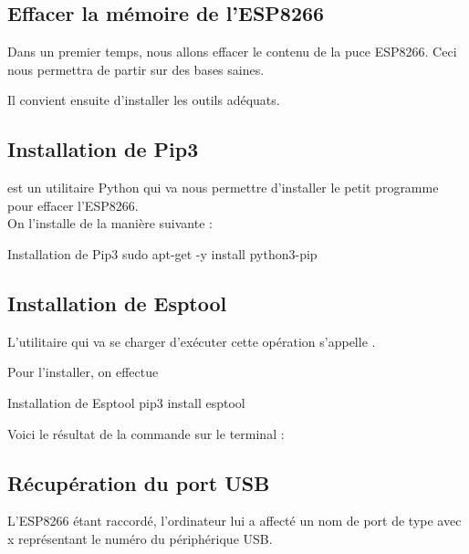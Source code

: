 
\subsection{Effacer la mémoire de l'ESP8266}

Dans un premier temps, nous allons effacer le contenu de la puce ESP8266. Ceci nous permettra de partir sur des bases saines. \\


Il convient ensuite d'installer les outils adéquats.

\subsection{Installation de Pip3}

 est un utilitaire Python qui va nous permettre d'installer le petit programme pour effacer l'ESP8266. \\
On l'installe de la manière suivante : 

\begin{Bash}{Installation de Pip3}
sudo apt-get -y install python3-pip
\end{Bash}


\subsection{Installation de Esptool}

L'utilitaire qui va se charger d'exécuter cette opération s'appelle .

Pour l'installer, on effectue

\begin{Bash}{Installation de Esptool}
pip3 install esptool
\end{Bash}

Voici le résultat de la commande sur le terminal : 




\subsection{Récupération du port USB}

L'ESP8266 étant raccordé, l'ordinateur lui a affecté un nom de port de type  avec x représentant le numéro du périphérique USB. \\


